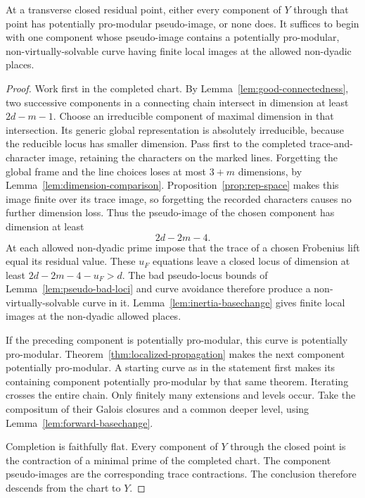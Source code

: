 \begin{lemma}\label{lem:chart-propagation}
At a transverse closed residual point, either every
component of \(Y\) through that point has potentially
pro-modular pseudo-image, or none does. It suffices
to begin with one component whose pseudo-image
contains a potentially pro-modular,
non-virtually-solvable curve having finite local
images at the allowed non-dyadic places.
\end{lemma}
\begin{proof}
Work first in the completed chart.
By Lemma~\ref{lem:good-connectedness}, two successive
components in a connecting chain intersect in
dimension at least \(2d-m-1\).
Choose an irreducible component of maximal dimension
in that intersection. Its generic global representation
is absolutely irreducible, because the reducible locus
has smaller dimension.
Pass first to the completed trace-and-character image,
retaining the characters on the marked lines.
Forgetting the global frame and the line choices loses
at most \(3+m\) dimensions, by
Lemma~\ref{lem:dimension-comparison}.
Proposition~\ref{prop:rep-space} makes this image finite
over its trace image, so forgetting the recorded characters
causes no further dimension loss.
Thus the pseudo-image of the chosen component has dimension at least
\[
 2d-2m-4.
\]
At each allowed non-dyadic prime impose that the
trace of a chosen Frobenius lift equal its residual
value. These \(u_F\) equations leave a closed locus
of dimension at least
\(2d-2m-4-u_F>d\).
The bad pseudo-locus bounds of
Lemma~\ref{lem:pseudo-bad-loci} and curve avoidance
therefore produce a non-virtually-solvable curve
in it. Lemma~\ref{lem:inertia-basechange} gives
finite local images at the non-dyadic allowed
places.

If the preceding component is potentially
pro-modular, this curve is potentially pro-modular.
Theorem~\ref{thm:localized-propagation} makes the
next component potentially pro-modular.
A starting curve as in the statement first makes
its containing component potentially pro-modular
by that same theorem. Iterating crosses the
entire chain. Only finitely many extensions and
levels occur. Take the compositum of their Galois
closures and a common deeper level, using
Lemma~\ref{lem:forward-basechange}.

Completion is faithfully flat. Every component
of \(Y\) through the closed point is the
contraction of a minimal prime of the completed
chart. The component pseudo-images are the
corresponding trace contractions. The conclusion
therefore descends from the chart to \(Y\).
\end{proof}


